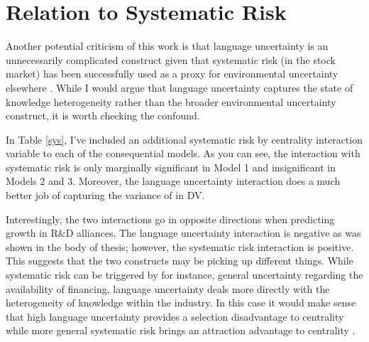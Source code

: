 \section{Relation to Systematic Risk}
Another potential criticism of this work is that language uncertainty is an unnecessarily complicated construct given that systematic risk (in the stock market) has been successfully used as a proxy for environmental uncertainty elsewhere \citep[see e.g.][]{lavie2007}. While I would argue that language uncertainty captures the state of knowledge heterogeneity rather than the broader environmental uncertainty construct, it is worth checking the confound. 

In Table \ref{sys}, I've included an additional systematic risk by centrality interaction variable to each of the consequential models. As you can see, the interaction with systematic risk is only marginally significant in Model 1 and insignificant in Models 2 and 3. Moreover, the language uncertainty interaction does a much better job of capturing the variance of in DV. 

Interestingly, the two interactions go in opposite directions when predicting growth in R\&D alliances. The language uncertainty interaction is negative as was shown in the body of thesis; however, the systematic risk interaction is positive. This suggests that the two constructs may be picking up different things. While systematic risk can be triggered by for instance, general uncertainty regarding the availability of financing, language uncertainty deals more directly with the heterogeneity of knowledge within the industry. In this case it would make sense that high language uncertainty provides a selection disadvantage to centrality while more general systematic risk brings an attraction advantage to centrality \citep[e.g.][]{podolny1994}. 

